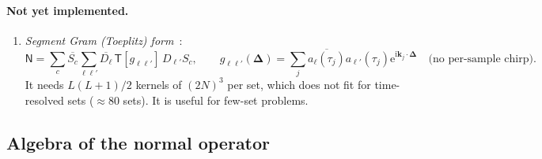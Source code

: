 \documentclass[11pt]{article}
\theoremstyle{remark}
\newcommand{\kk}{\bm k}
\newcommand{\DD}{\bm\Delta}
\newcommand{\ii}{\mathrm i}
\newcommand{\ee}{\mathrm e}
\newcommand{\Top}[1]{\mathsf T[#1]}
\newcommand{\Nop}{\mathsf N}
\begin{document}
\paragraph{Not yet implemented.}
\begin{enumerate}
  \item \emph{Segment Gram (Toeplitz) form}~\cite{fessler2005}:
  \[\Nop=\sum_c\overline{S_c}\sum_{\ell\ell'}\overline{D_\ell}\,\Top{g_{\ell\ell'}}\,D_{\ell'}S_c,\qquad g_{\ell\ell'}(\DD)=\sum_j\overline{a_\ell(\tau_j)}a_{\ell'}(\tau_j)\ee^{\ii\kk_j\cdot\DD}\quad\text{(no per-sample chirp).}\] It needs $L(L+1)/2$ kernels of $(2N)^3$ per set, which does not fit for time-resolved sets ($\approx80$ sets). It is useful for few-set problems.
\end{enumerate}

\subsection{Algebra of the normal operator}
\label{sec:weyl}
\end{document}
